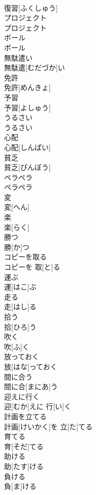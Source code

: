 \documentclass[8pt]{extreport}
\begin{document}
\begin{CJK}{UTF8}{min}
\\	復習[ふくしゅう]
\\	プロジェクト	
\\	プロジェクト
\\	ボール	
\\	ボール
\\	無駄遣い	
\\	無駄遣[むだづか]い
\\	免許	
\\	免許[めんきょ]
\\	予習	
\\	予習[よしゅう]
\\	うるさい	
\\	うるさい
\\	心配	
\\	心配[しんぱい]
\\	貧乏	
\\	貧乏[びんぼう]
\\	ペラペラ	
\\	ペラペラ
\\	変	
\\	変[へん]
\\	楽	
\\	楽[らく]
\\	勝つ	
\\	勝[か]つ
\\	コピーを取る	
\\	コピーを 取[と]る
\\	運ぶ	
\\	運[はこ]ぶ
\\	走る	
\\	走[はし]る
\\	拾う	
\\	拾[ひろ]う
\\	吹く	
\\	吹[ふ]く
\\	放っておく	
\\	放[はな]っておく
\\	間に合う	
\\	間に合[まにあ]う
\\	迎えに行く	
\\	迎[むか]えに 行[い]く
\\	計画を立てる	
\\	計画[けいかく]を 立[た]てる
\\	育てる	
\\	育[そだ]てる
\\	助ける	
\\	助[たす]ける
\\	負ける	
\\	負[ま]ける

\end{CJK}
\end{document}
